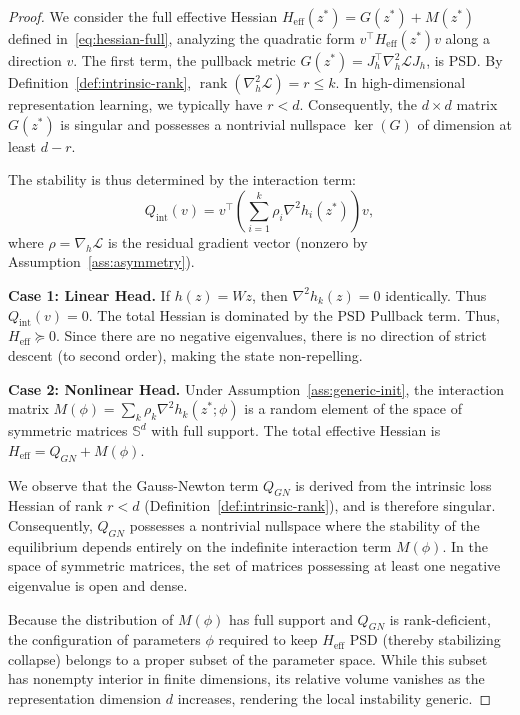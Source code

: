 \documentclass{article}
\theoremstyle{plain}
\theoremstyle{definition}
\theoremstyle{remark}
\begin{document}
\begin{proof}
We consider the full effective Hessian $H_{\text{eff}}(z^*) = G(z^*) + M(z^*)$ defined in~\eqref{eq:hessian-full}, analyzing the quadratic form $v^\top H_{\text{eff}}(z^*) v$ along a direction $v$. The first term, the pullback metric $G(z^*) = J_h^\top \nabla_h^2 \mathcal{L} J_h$, is PSD. By Definition~\ref{def:intrinsic-rank}, $\operatorname{rank}(\nabla_h^2 \mathcal{L}) = r \le k$. In high-dimensional representation learning, we typically have $r < d$. Consequently, the $d \times d$ matrix $G(z^*)$ is singular and possesses a nontrivial nullspace $\ker(G)$ of dimension at least $d-r$.

The stability is thus determined by the interaction term:
\begin{equation*}
    Q_{\text{int}}(v) = v^\top \left( \sum_{i=1}^k \rho_i \nabla^2 h_i(z^*) \right) v,
\end{equation*}
where $\rho = \nabla_h \mathcal{L}$ is the residual gradient vector (nonzero by Assumption~\ref{ass:asymmetry}).

\textbf{Case 1: Linear Head.} If $h(z) = Wz$, then $\nabla^2 h_k(z) = 0$ identically. Thus $Q_{\text{int}}(v) = 0$. The total Hessian is dominated by the PSD Pullback term. Thus, $H_{\text{eff}} \succeq 0$. Since there are no negative eigenvalues, there is no direction of strict descent (to second order), making the state non-repelling.

\textbf{Case 2: Nonlinear Head.} Under Assumption~\ref{ass:generic-init}, the interaction matrix $M(\phi) = \sum_k \rho_k \nabla^2 h_k(z^*; \phi)$ is a random element of the space of symmetric matrices $\mathbb{S}^d$ with full support. The total effective Hessian is $H_{\text{eff}} = Q_{GN} + M(\phi)$.

We observe that the Gauss-Newton term $Q_{GN}$ is derived from the intrinsic loss Hessian of rank $r < d$ (Definition~\ref{def:intrinsic-rank}), and is therefore singular. Consequently, $Q_{GN}$ possesses a nontrivial nullspace where the stability of the equilibrium depends entirely on the indefinite interaction term $M(\phi)$. In the space of symmetric matrices, the set of matrices possessing at least one negative eigenvalue is open and dense.

Because the distribution of $M(\phi)$ has full support and $Q_{GN}$ is rank-deficient, the configuration of parameters $\phi$ required to keep $H_{\text{eff}}$ PSD (thereby stabilizing collapse) belongs to a proper subset of the parameter space. While this subset has nonempty interior in finite dimensions, its relative volume vanishes as the representation dimension $d$ increases, rendering the local instability generic.
\end{proof}
\end{document}
